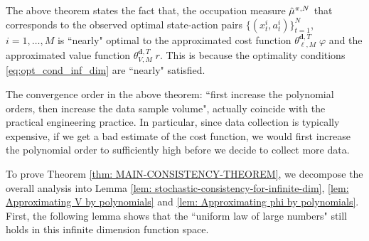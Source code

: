 \begin{remark}
The above theorem states the fact that, 
the occupation measure $\hat{\mu}^{\relax{\pi}, N}$ that corresponds to the observed optimal state-action pairs $\{(x_t^i,a_t^i)\}_{t=1}^N$, $i=1,\ldots,M$ is ``nearly" optimal to the approximated cost function $\theta_{\ell, M}^{\mathbf{d},T}\;\varphi$ and the approximated value function $\theta_{V, M}^{\mathbf{d},T}\;r$. This is because the optimality conditions \eqref{eq:opt_cond_inf_dim} are ``nearly" satisfied.
\end{remark}

\begin{remark}
The convergence order in the above theorem: ``first increase the polynomial orders, then increase the data sample volume", actually coincide with the practical engineering practice. In particular, since data collection is typically expensive, if we get a bad estimate of the cost function, we would first increase the polynomial order to sufficiently high before we decide to collect more data.


\end{remark}

To prove Theorem \ref{thm: MAIN-CONSISTENCY-THEOREM}, we decompose the overall analysis into Lemma \ref{lem: stochastic-consistency-for-infinite-dim}, \ref{lem: Approximating V by polynomials} and \ref{lem: Approximating phi by polynomials}. 
First, the following lemma shows that the ``uniform law of large numbers" still holds in this infinite dimension function space.

